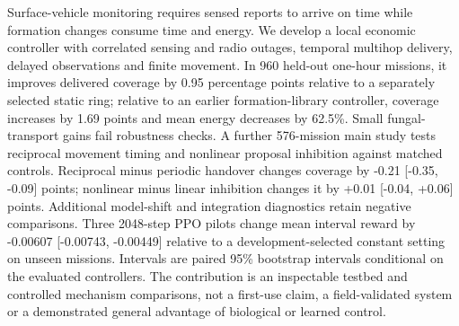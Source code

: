 Surface-vehicle monitoring requires sensed reports to arrive on time while formation changes consume time and energy. We develop a local economic controller with correlated sensing and radio outages, temporal multihop delivery, delayed observations and finite movement. In 960 held-out one-hour missions, it improves delivered coverage by 0.95 percentage points relative to a separately selected static ring; relative to an earlier formation-library controller, coverage increases by 1.69 points and mean energy decreases by 62.5\%. Small fungal-transport gains fail robustness checks. A further 576-mission main study tests reciprocal movement timing and nonlinear proposal inhibition against matched controls. Reciprocal minus periodic handover changes coverage by -0.21 [-0.35, -0.09] points; nonlinear minus linear inhibition changes it by +0.01 [-0.04, +0.06] points. Additional model-shift and integration diagnostics retain negative comparisons. Three 2048-step PPO pilots change mean interval reward by -0.00607 [-0.00743, -0.00449] relative to a development-selected constant setting on unseen missions. Intervals are paired 95\% bootstrap intervals conditional on the evaluated controllers. The contribution is an inspectable testbed and controlled mechanism comparisons, not a first-use claim, a field-validated system or a demonstrated general advantage of biological or learned control.

